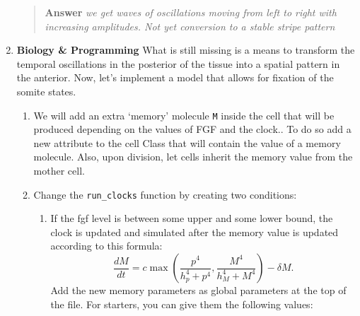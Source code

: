 \documentclass[
  letterpaper,
  DIV=11,
  numbers=noendperiod]{scrreprt}
\theoremstyle{definition}
\theoremstyle{remark}
\begin{document}
\begin{enumerate}
  \begin{quote}
  \textbf{Answer} \emph{we get waves of oscillations moving from left to
  right with increasing amplitudes. Not yet conversion to a stable
  stripe pattern}
  \end{quote}
\item
  \textbf{Biology \& Programming} What is still missing is a means to
  transform the temporal oscillations in the posterior of the tissue
  into a spatial pattern in the anterior. Now, let's implement a model
  that allows for fixation of the somite states.

  \begin{enumerate}
  \def\labelenumii{\arabic{enumii}.}
  \item
    We will add an extra `memory' molecule \texttt{M} inside the cell
    that will be produced depending on the values of FGF and the clock..
    To do so add a new attribute to the cell Class that will contain the
    value of a memory molecule. Also, upon division, let cells inherit
    the memory value from the mother cell.
  \item
    Change the \texttt{run\_clocks} function by creating two conditions:

    \begin{enumerate}
    \def\labelenumiii{\arabic{enumiii}.}
    \item
      If the fgf level is between some upper and some lower bound, the
      clock is updated and simulated after the memory value is updated
      according to this formula:
      \[\frac{dM}{dt}=c\max\left(\frac{p^4}{h_p^4+p^4}, \frac{M^4}{h_M^4+M^4}\right)-\delta M.\]
      Add the new memory parameters as global parameters at the top of
      the file. For starters, you can give them the following values:


\end{enumerate}
\end{enumerate}
\end{enumerate}
\end{document}
